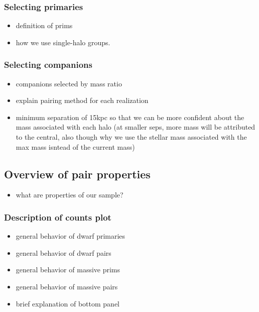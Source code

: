\documentclass[twocolumn]{aastex631}
\begin{document}
    \subsubsection{Selecting primaries}
            \begin{itemize}
                \item definition of prims
                \item how we use single-halo groups. 
            \end{itemize}
    \subsubsection{Selecting companions}
            \begin{itemize}
                \item companions selected by mass ratio
                \item explain pairing method for each realization
                \item minimum separation of 15kpc so that we can be more confident about the mass associated with each halo (at smaller seps, more mass will be attributed to the central, also though why we use the stellar mass associated with the max mass isntead of the current mass) 
            \end{itemize}
            

    
\subsection{Overview of pair properties} \label{sec:methods-props}
    \begin{itemize}
        \item what are properties of our sample?
    \end{itemize}
    \subsubsection{Description of counts plot}
            \begin{itemize}
                \item general behavior of dwarf primaries
                \item general behavior of dwarf pairs
                \item general behavior of massive prims
                \item general behavior of massive pairs
                \item brief explanation of bottom panel
            \end{itemize}
\end{document}
